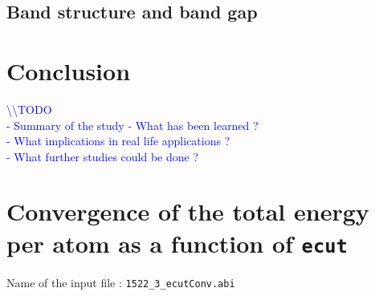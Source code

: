 \documentclass[11pt,a4paper]{article}
\begin{document}
\subsection{Band structure and band gap}
\section{Conclusion}
\textcolor{blue}{
\textbackslash\textbackslash TODO\\
- Summary of the study
- What has been learned ? \\
- What implications in real life applications ?\\
- What further studies could be done ?}
\newpage
{}


\newpage
\appendix
\section{Convergence of the total energy per atom as a function of \texttt{ecut}}
\label{Abi1}
Name of the input file : \texttt{1522\_3\_ecutConv.abi}
\end{document}
